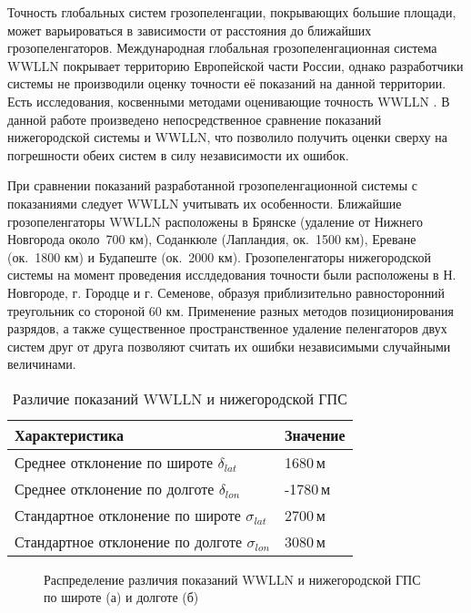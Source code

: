 Точность глобальных систем грозопеленгации, покрывающих большие площади, может варьироваться в зависимости от расстояния до ближайших грозопеленгаторов. Международная глобальная грозопеленгационная система WWLLN покрывает территорию Европейской части России, однако разработчики системы не производили оценку точности её показаний на данной территории. Есть исследования, косвенными методами оценивающие точность WWLLN \cite{Gubenko2014}. В данной работе произведено непосредственное сравнение показаний нижегородской системы и WWLLN, что позволило получить оценки сверху на погрешности обеих систем в силу независимости их ошибок.

При сравнении показаний разработанной грозопеленгационной системы с показаниями следует WWLLN учитывать их особенности. 
Ближайшие грозопеленгаторы WWLLN расположены в Брянске (удаление от Нижнего Новгорода около~700 км), Соданкюле (Лапландия, ок.~1500 км), Ереване (ок.~1800 км) и Будапеште (ок.~2000 км). Грозопеленгаторы нижегородской системы на момент проведения исслдедования точности были расположены в Н. Новгороде, г. Городце и г. Семенове, образуя приблизительно равносторонний треугольник со стороной 60 км. Применение разных методов позиционирования разрядов, а также существенное пространственное удаление пеленгаторов двух систем друг от друга позволяют считать их ошибки независимыми случайными величинами.

\begin{table}[h]
	\begin{center}
		\begin{tabular}{l|l}
			Характеристика & Значение \\
			\hline
			Среднее отклонение по широте $\delta_{lat}$ & 1680\,м \\
			Среднее отклонение по долготе $\delta_{lon}$ & -1780\,м \\
			Стандартное отклонение по широте $\sigma_{lat}$ & 2700\,м \\
			Стандартное отклонение по долготе $\sigma_{lon}$ & 3080\,м \\
		\end{tabular}	
	\end{center}
	\caption{Различие показаний WWLLN и нижегородской ГПС}
	\label{tab:err-pars}
\end{table}

\begin{figure}[h]
	\caption{Распределение различия показаний WWLLN и нижегородской ГПС по широте (а) и долготе (б)}
	\label{fig:lds-wwlln-diff}
\end{figure}

